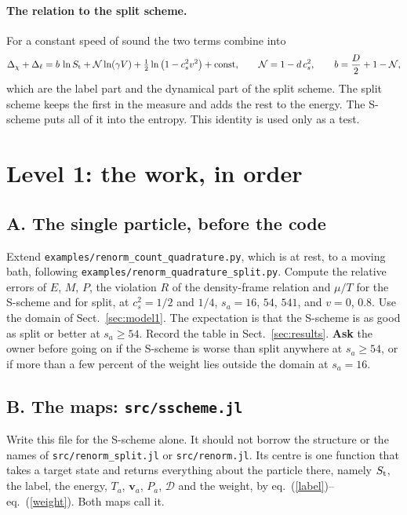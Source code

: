 \documentclass[11pt,aps,preprint,nofootinbib,superscriptaddress,tightenlines]{revtex4-2}
\def\st{\begin{equation}}
\def\stp{\end{equation}}
\def\Eq#1{eq.~(\ref{#1})}
\def\Sect#1{Sect.~\ref{#1}}
\let\oldparagraph\paragraph
\renewcommand{\paragraph}{\par\bigskip\oldparagraph}
\begin{document}
\paragraph{The relation to the split scheme.}  For a constant speed of sound the two terms combine into
\st
\Delta_\chi+\Delta_\ell=b\,\ln S_{\rm t}+\mathcal N\ln(\gamma V)+\tfrac12\ln\big(1-c_s^2v^2\big)+\text{const},\qquad
\mathcal N=1-d\,c_s^2,\qquad b=\frac D2+1-\mathcal N ,
\label{splitrel}
\stp
which are the label part and the dynamical part of the split scheme.  The split scheme keeps the first in the measure and adds the rest to the
energy.  The S-scheme puts all of it into the entropy.  This identity is used only as a test.

\section{Level 1: the work, in order}
\label{sec:work1}

\subsection{A. The single particle, before the code}

Extend \nolinkurl{examples/renorm_count_quadrature.py}, which is at rest, to a moving bath, following
\nolinkurl{examples/renorm_quadrature_split.py}.  Compute the relative errors of $E$, $M$, $P$, the violation $R$ of the density-frame relation and
$\mu/T$ for the S-scheme and for split, at $c_s^2=1/2$ and $1/4$, $s_a=16$, $54$, $541$, and $v=0$, $0.8$.  Use the domain of \Sect{sec:model1}.  The
expectation is that the S-scheme is as good as split or better at $s_a\ge54$.  Record the table in \Sect{sec:results}.
\textbf{Ask} the owner before going on if the S-scheme is worse than split anywhere at $s_a\ge54$, or if more than a few percent of the weight lies
outside the domain at $s_a=16$.

\subsection{B. The maps: \texorpdfstring{\nolinkurl{src/sscheme.jl}}{src/sscheme.jl}}

Write this file for the S-scheme alone.  It should not borrow the structure or the names of \nolinkurl{src/renorm_split.jl} or
\nolinkurl{src/renorm.jl}.  Its centre is one function that takes a target state and returns everything about the particle there, namely
$S_{\rm t}$, the label, the energy, $T_a$, $\bm v_a$, $P_a$, $\mathcal D$ and the weight, by \Eq{label}--\Eq{weight}.  Both maps call it.
\end{document}
